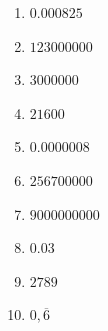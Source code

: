 %
%
  \begin{enumerate}[cols=4]
    \item $\num{0,000825}$
    \item $\num{123000000}$
    \item $\num{3000000}$
    \item $2\num{1600}$
    \item $\num{0,0000008}$
    \item $\num{256700000}$
    \item $\num{9000000000}$
    \item $\num{0,03}$
    \item $\num{2789}$
    \item $0,\overline{6}$
  \end{enumerate}

